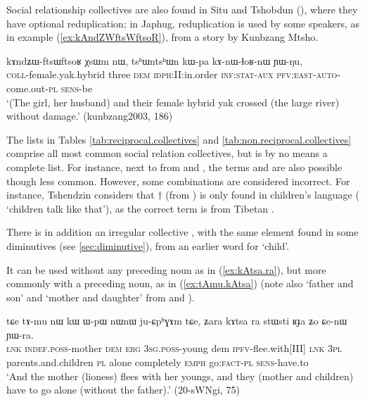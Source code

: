 Social relationship collectives are also found in Situ and Tshobdun (\citealt[107]{jackson98morphology}), where they have optional reduplication; in Japhug, reduplication is used by some speakers, as  in example (\ref{ex:kAndZWftsWftsoR}), from a story by Kunbzang Mtsho.

\begin{exe}
\ex \label{ex:kAndZWftsWftsoR}
 \gll kɤndʑɯ-ftsɯ\redp{}ftsoʁ χsɯm nɯ, tsʰɯntsʰɯn kɯ-pa kɤ-nɯ-ɬoʁ-nɯ ɲɯ-ŋu, \\
 \textsc{coll}-female.yak.hybrid three \textsc{dem} \textsc{idph}:II:in.order \textsc{inf}:\textsc{stat}-\textsc{aux} \textsc{pfv}:\textsc{east}-\textsc{auto}-come.out-\textsc{pl} \textsc{sens}-be \\
\glt `(The girl, her husband) and their female hybrid yak crossed (the large river) without damage.' (kunbzang2003, 186)
\end{exe}

The lists in Tables \ref{tab:reciprocal.collectives} and \ref{tab:non.reciprocal.collectives} comprise all most common social relation collectives, but is by no means a complete list. For instance, next to  from  and , the terms  and  are also possible though less common. However, some combinations are considered incorrect. For instance, Tshendzin considers that $\dagger$ (from ) is only found in children's language ( `children talk like that'), as the correct term  is  from Tibetan .

There is in addition an irregular collective , with the same element  found in some diminutives (see \ref{sec:diminutive}), from an earlier word for `child'.

It can be used without any preceding noun as in (\ref{ex:kAtsa.ra}), but more commonly with a preceding noun, as in (\ref{ex:tAmu.kAtsa}) (note also  `father and son' and  `mother and daughter' from  and ).

\begin{exe}
\ex \label{ex:kAtsa.ra}
\gll tɕe tɤ-mu nɯ kɯ ɯ-pɯ nɯnɯ ju-ɕpʰɣɤm tɕe, ʑara kɤtsa ra stɯsti ʁɟa ʑo ɕe-nɯ ɲɯ-ra. \\
\textsc{lnk} \textsc{indef}.\textsc{poss}-mother \textsc{dem} \textsc{erg} \textsc{3sg}.\textsc{poss}-young dem \textsc{ipfv}-flee.with[III] \textsc{lnk} \textsc{3pl} parents.and.children \textsc{pl} alone completely \textsc{emph} go:\textsc{fact}-\textsc{pl} \textsc{sens}-have.to \\
\glt `And the mother (lioness) flees with her youngs, and they (mother and children) have to go alone (without the father).' (20-sWNgi, 75)
\end{exe}

